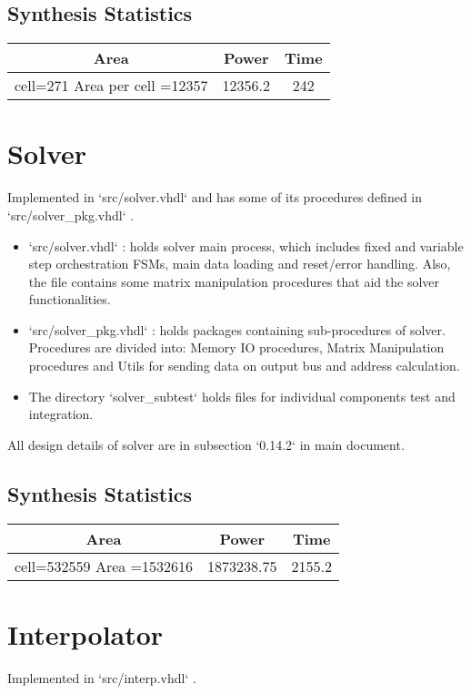 \documentclass[12pt]{report}
\begin{document}
    \subsection{Synthesis Statistics}
    \begin{tabular}{||c|c|c||}
        \hline
        Area & Power & Time\\\hline\hline
        cell=271 Area per cell =12357 & 12356.2 & 242\\\hline
    \end{tabular}

    \section{Solver}
    Implemented in `src/solver.vhdl` and has some of its procedures defined in `src/solver\_pkg.vhdl` . 

    \begin{itemize}
        \item `src/solver.vhdl` : holds solver main process, which includes fixed and variable step orchestration FSMs, main data loading and reset/error handling. Also, the file contains some matrix manipulation procedures that aid the solver functionalities.
        \item `src/solver\_pkg.vhdl` : holds packages containing sub-procedures of solver. Procedures are divided into: Memory IO procedures, Matrix Manipulation procedures and Utils for sending data on output bus and address calculation.
        \item The directory `solver\_subtest` holds files for individual components test and integration.
    \end{itemize}

    All design details of solver are in subsection `0.14.2` in main document. 
    \subsection{Synthesis Statistics}
    \begin{tabular}{||c|c|c||}
        \hline
        Area & Power & Time\\\hline\hline
        cell=532559 Area =1532616 & 1873238.75 & 2155.2\\\hline
    \end{tabular}

    \section{Interpolator}
    Implemented in `src/interp.vhdl` . 
\end{document}
